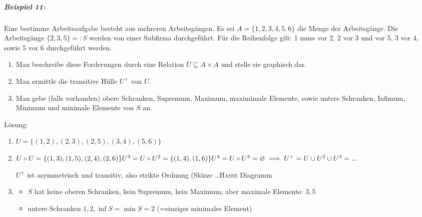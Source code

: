 \documentclass[a4paper]{scrartcl}
\begin{document}
\subparagraph{Beispiel 11:} Eine bestimme Arbeitsaufgabe besteht aus mehreren Arbeitsgängen. Es sei $A=\{1,2,3,4,5,6\}$ die Menge der Arbeitsgänge. Die Arbeitsgänge $\{2,3,5\}=:S$ werden von einer Subfirma durchgeführt. Für die Reihenfolge gilt: 1 muss vor 2, 2 vor 3 und vor 5, 3 vor 4, sowie 5 vor 6 durchgeführt werden.
\begin{enumerate}
\item Man beschreibe diese Forderungen durch eine Relation $U \subseteq A \times A$ und stelle sie graphisch dar. \label{AufgA}
\item Man ermittle die transitive Hülle $U^+$ von $U$.\label{AufgB}
\item Man gebe (falls vorhanden) obere Schranken, Supremum, Maximum, maximimale \label{AufgC} Elemente, sowie untere Schranken, Infimum, Minimum und minimale Elemente von $S$ an.
\end{enumerate}

Lösung: 
\begin{enumerate}
\item $U=\{(1,2),(2,3),(2,5),(3,4),(5,6)\}$


\item $U \circ U = \{(1,3),(1,5),(2,4),(2,6)\}\\
U^3 = U \circ U^2 = \{(1,4),(1,6)\}\\
U^4 = U \circ U^3 = \varnothing \\
\implies U^+ = U \cup U^2 \cup U^3 = ...$

$U^+$ ist asymmetrisch und transitiv, also strikte Ordnung (Skizze \dots \textsc{Hasse} Diagramm

\item
\begin{itemize}
\item $S$ hat keine oberen Schranken, kein Supremum, kein Maximum; aber maximale Elemente: $3,5$
\item untere Schranken $1,2,  \inf{S} = \min{S} = 2$ (=einziges minimales Element)
\end{itemize}
\end{enumerate}
\end{document}
